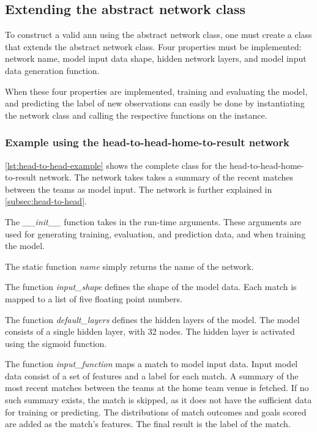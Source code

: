 \subsection{Extending the abstract network class}

To construct a valid \gls{ann} using the abstract network class, one must create a class that extends the abstract network class. Four properties must be implemented: network name, model input data shape, hidden network layers, and model input data generation function.

When these four properties are implemented, training and evaluating the model, and predicting the label of new observations can easily be done by instantiating the network class and calling the respective functions on the instance.

\subsubsection{Example using the head-to-head-home-to-result network}

\cref{lst:head-to-head-example} shows the complete class for the head-to-head-home-to-result network. The network takes takes a summary of the recent matches between the teams as model input. The network is further explained in \cref{subsec:head-to-head}.

The \textit{\_\_init\_\_} function takes in the run-time arguments. These arguments are used for generating training, evaluation, and prediction data, and when training the model.

The static function \textit{name} simply returns the name of the network.

The function \textit{input\_shape} defines the shape of the model data. Each match is mapped to a list of five floating point numbers.

The function \textit{default\_layers} defines the hidden layers of the model. The model consists of a single hidden layer, with 32 nodes. The hidden layer is activated using the sigmoid function.

The function \textit{input\_function} maps a match to model input data. Input model data consist of a set of features and a label for each match. A summary of the most recent matches between the teams at the home team venue is fetched. If no such summary exists, the match is skipped, as it does not have the sufficient data for training or predicting. The distributions of match outcomes and goals scored are added as the match's features. The final result is the label of the match.

